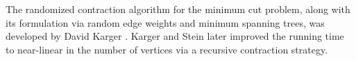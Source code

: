 The randomized contraction algorithm for the minimum cut problem, along
with its formulation via random edge weights and minimum spanning trees, was
developed by David Karger \cite{k-gmcro-93}. Karger and Stein
\cite{ks-namcp-96} later improved the running time to near-linear in the
number of vertices via a recursive contraction strategy.


\ChapterEnd{}



